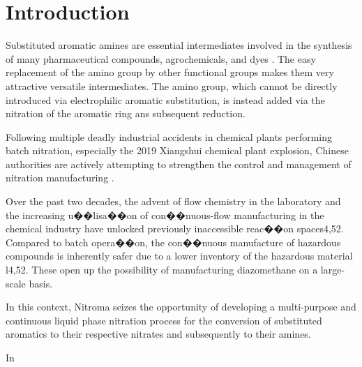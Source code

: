 \section{Introduction} %


Substituted aromatic amines are essential intermediates involved in the synthesis of many pharmaceutical compounds, agrochemicals, and dyes \cite{vogt_amines_2000}. The easy replacement of the amino group by other functional groups makes them very attractive versatile intermediates. The amino group, which cannot be directly introduced via electrophilic aromatic substitution, is instead added via the nitration of the aromatic ring ans subsequent reduction.

Following multiple deadly industrial accidents in chemical plants performing batch nitration, especially the 2019 Xiangshui chemical plant explosion, Chinese authorities are actively attempting to strengthen the control and management of nitration manufacturing \cite{el_diario_china_2019}.

Over the past two decades, the advent of flow chemistry in the laboratory and the increasing
u��lisa��on of con��nuous-flow manufacturing in the chemical industry have unlocked previously
inaccessible reac��on spaces4,52. Compared to batch opera��on, the con��nuous manufacture of
hazardous compounds is inherently safer due to a lower inventory of the hazardous material l4,52.
These open up the possibility of manufacturing diazomethane on a large-scale basis.


In this context, Nitroma seizes the opportunity of developing a multi-purpose and continuous liquid phase nitration process for the conversion of substituted aromatics to their respective nitrates and subsequently to their amines. 

In
%

